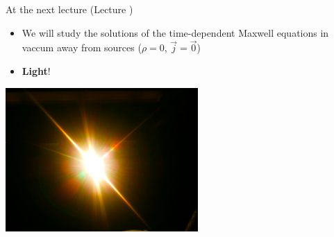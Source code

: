 \begin{frame}{At the next lecture (Lecture \nextlecture)}

\begin{itemize}
  \item We will study the solutions of the time-dependent Maxwell equations in vaccum
            away from sources ($\rho = 0$, $\vec{j} = \vec{0}$)
  \vspace{0.3cm}
  \item {\bf Light}!
\end{itemize}

\vspace{0.3cm}

\begin{center}
   \includegraphics[width=0.55\textwidth]{./images/photos/beam_of_light.jpg}\\
\end{center}

\end{frame}

